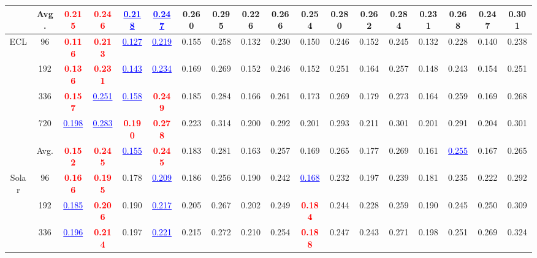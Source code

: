 \begin{table}[t]
{\begin{tabular}{cc|cc|cc|cc|cc|cc|cc|cc|cc}
\cmidrule(lr){2-18}
 & Avg. & \textcolor{red}{\textbf{0.215}} & \textcolor{red}{\textbf{0.246}} & \textcolor{blue}{\underline{0.218}} & \textcolor{blue}{\underline{0.247}} & 0.260 & 0.295 & 0.226 & 0.266 & 0.254 & 0.280 & 0.262 & 0.284 & 0.231 & 0.268 & 0.247 & 0.301 \\
\midrule
\multirow{5}{*}{ECL} & 96 & \textcolor{red}{\textbf{0.116}} & \textcolor{red}{\textbf{0.213}} & \textcolor{blue}{\underline{0.127}} & \textcolor{blue}{\underline{0.219}} & 0.155 & 0.258 & 0.132 & 0.230 & 0.150 & 0.246 & 0.152 & 0.245 & 0.132 & 0.228 & 0.140 & 0.238 \\
 & 192 & \textcolor{red}{\textbf{0.136}} & \textcolor{red}{\textbf{0.231}} & \textcolor{blue}{\underline{0.143}} & \textcolor{blue}{\underline{0.234}} & 0.169 & 0.269 & 0.152 & 0.246 & 0.152 & 0.251 & 0.164 & 0.257 & 0.148 & 0.243 & 0.154 & 0.251 \\
 & 336 & \textcolor{red}{\textbf{0.157}} & \textcolor{blue}{\underline{0.251}} & \textcolor{blue}{\underline{0.158}} & \textcolor{red}{\textbf{0.249}} & 0.185 & 0.284 & 0.166 & 0.261 & 0.173 & 0.269 & 0.179 & 0.273 & 0.164 & 0.259 & 0.169 & 0.268 \\
 & 720 & \textcolor{blue}{\underline{0.198}} & \textcolor{blue}{\underline{0.283}} & \textcolor{red}{\textbf{0.190}} & \textcolor{red}{\textbf{0.278}} & 0.223 & 0.314 & 0.200 & 0.292 & 0.201 & 0.293 & 0.211 & 0.301 & 0.201 & 0.291 & 0.204 & 0.301 \\
\cmidrule(lr){2-18}
 & Avg. & \textcolor{red}{\textbf{0.152}} & \textcolor{red}{\textbf{0.245}} & \textcolor{blue}{\underline{0.155}} & \textcolor{red}{\textbf{0.245}} & 0.183 & 0.281 & 0.163 & 0.257 & 0.169 & 0.265 & 0.177 & 0.269 & 0.161 & \textcolor{blue}{\underline{0.255}} & 0.167 & 0.265 \\
\midrule
\multirow{5}{*}{Solar} & 96 & \textcolor{red}{\textbf{0.166}} & \textcolor{red}{\textbf{0.195}} & 0.178 & \textcolor{blue}{\underline{0.209}} & 0.186 & 0.256 & 0.190 & 0.242 & \textcolor{blue}{\underline{0.168}} & 0.232 & 0.197 & 0.239 & 0.181 & 0.235 & 0.222 & 0.292 \\
 & 192 & \textcolor{blue}{\underline{0.185}} & \textcolor{red}{\textbf{0.206}} & 0.190 & \textcolor{blue}{\underline{0.217}} & 0.205 & 0.267 & 0.202 & 0.249 & \textcolor{red}{\textbf{0.184}} & 0.244 & 0.228 & 0.259 & 0.190 & 0.245 & 0.250 & 0.309 \\
 & 336 & \textcolor{blue}{\underline{0.196}} & \textcolor{red}{\textbf{0.214}} & 0.197 & \textcolor{blue}{\underline{0.221}} & 0.215 & 0.272 & 0.210 & 0.254 & \textcolor{red}{\textbf{0.188}} & 0.247 & 0.243 & 0.271 & 0.198 & 0.251 & 0.269 & 0.324 \\

\end{tabular}}
\end{table}
